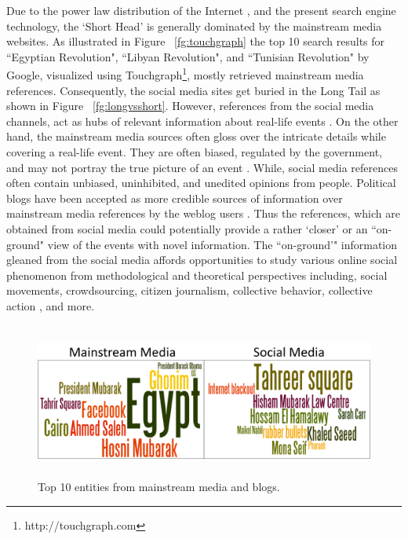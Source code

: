Due to the power law distribution of the Internet \cite{adamic2000power}, and the present search engine technology, the `Short Head' is generally dominated by the mainstream media websites. As illustrated in Figure ~\ref{fg:touchgraph} the top 10 search results for ``Egyptian Revolution", ``Libyan Revolution", and ``Tunisian Revolution" by Google, visualized using Touchgraph\footnote{http://touchgraph.com}, mostly retrieved mainstream media references. Consequently, the social media sites get buried in the Long Tail \cite{LOmariba} as shown in Figure ~\ref{fg:longvsshort}. However, references from the social media channels, act as hubs of relevant information about real-life events \cite{harb2011arab}. On the other hand, the mainstream media sources often gloss over the intricate details while covering a real-life event. They are often biased, regulated by the government, and may not portray the true picture of an event \cite{hamdy2012framing}. While, social media references often contain unbiased, uninhibited, and unedited opinions from people. Political blogs have been accepted as more credible sources of information over mainstream media references by the weblog users \cite{johnson2004wag}. Thus the references, which are obtained from social media could potentially provide a rather `closer'  or an ``on-ground" view of the events with novel information. The ``on-ground'" information gleaned from the social media affords opportunities to study various online social phenomenon from methodological and theoretical perspectives including, social movements, crowdsourcing, citizen journalism, collective behavior, collective action \cite{agarwal2011finding,agarwal2012online,agarwal2012raising}, and more.

\begin{figure}[htbp]
\centering
\includegraphics[height=2in,width=4.5in]{Figures/Chapter3Figures/comp.pdf}
\caption{Top 10 entities from mainstream media and blogs.}
\label{fg:comp}
\end{figure}

